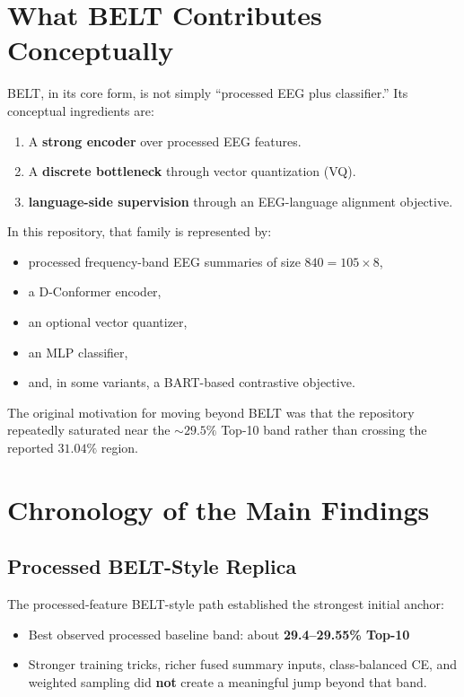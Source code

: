 \documentclass[11pt]{article}
\begin{document}
\section{What BELT Contributes Conceptually}

BELT, in its core form, is not simply ``processed EEG plus classifier.'' Its conceptual ingredients are:
\begin{enumerate}
    \item A \textbf{strong encoder} over processed EEG features.
    \item A \textbf{discrete bottleneck} through vector quantization (VQ).
    \item \textbf{language-side supervision} through an EEG-language alignment objective.
\end{enumerate}

In this repository, that family is represented by:
\begin{itemize}
    \item processed frequency-band EEG summaries of size \(840 = 105 \times 8\),
    \item a D-Conformer encoder,
    \item an optional vector quantizer,
    \item an MLP classifier,
    \item and, in some variants, a BART-based contrastive objective.
\end{itemize}

The original motivation for moving beyond BELT was that the repository repeatedly saturated near the \(\sim 29.5\%\) Top-10 band rather than crossing the reported \(31.04\%\) region.

\section{Chronology of the Main Findings}

\subsection{Processed BELT-Style Replica}

The processed-feature BELT-style path established the strongest initial anchor:
\begin{itemize}
    \item Best observed processed baseline band: about \textbf{29.4--29.55\% Top-10}
    \item Stronger training tricks, richer fused summary inputs, class-balanced CE, and weighted sampling did \textbf{not} create a meaningful jump beyond that band.
\end{itemize}
\end{document}
